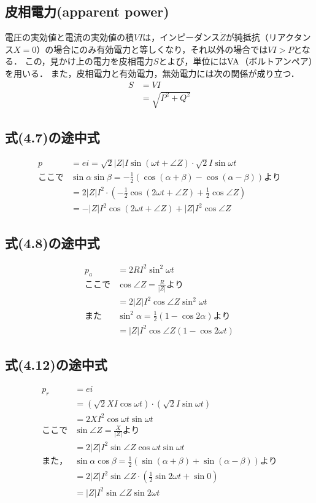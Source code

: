 \subsection{皮相電力(apparent power)\cite{11300007922816}}
電圧の実効値と電流の実効値の積$VI$は，インピーダンス$\dot{Z}$が純抵抗（リアクタンス$X=0$）の場合にのみ有効電力と等しくなり，それ以外の場合では$VI> P$となる．
この，見かけ上の電力を皮相電力$S$とよび，単位には$\rm{VA}$（ボルトアンペア）を用いる．
また，皮相電力と有効電力，無効電力には次の関係が成り立つ．
\begin{align}
	S &= VI\nonumber\\
	&= \sqrt{P^2+Q^2}
\end{align}

\subsection{式(4.7)の途中式}
\begin{align*}
	p&=ei=\sqrt{2}|Z|I\sin (\omega t+ \angle Z)  \cdot \sqrt{2}I\sin \omega t\\
	ここで&\sin \alpha \sin \beta=-\frac{1}{2}\left(\cos (\alpha +\beta)-\cos (\alpha -\beta)\right)より\\
	&=2|Z|I^{2}\cdot \left(-\frac{1}{2}\cos (2\omega t +\angle Z)+\frac{1}{2}\cos \angle Z\right)\\
	&=-|Z|I^{2}\cos (2\omega t+\angle Z)+|Z|I^{2}\cos \angle Z
\end{align*}

\subsection{式(4.8)の途中式}
\begin{align*}
	p_{a}&=2RI^{2}\sin ^{2} \omega t\\
	ここで&\cos \angle Z=\frac{R}{|Z|}より\\
	&=2|Z|I^{2}\cos \angle Z\sin ^{2} \omega t\\
	また&\sin ^{2} \alpha =\frac{1}{2}\left(1-\cos 2 \alpha\right)より\\
	&=|Z|I^{2}\cos \angle Z(1-\cos 2\omega t)
\end{align*}

\subsection{式(4.12)の途中式}
\begin{align*}
	p_{r}&=ei\\
	&=(\sqrt{2}XI\cos \omega t) \cdot (\sqrt{2}I\sin \omega t)\\
	&=2XI^{2}\cos \omega t \sin \omega t\\
	ここで&\sin \angle Z=\frac{X}{|Z|}より\\
	&=2|Z|I^{2}\sin \angle Z\cos \omega t \sin \omega t\\
	また，&\sin \alpha \cos \beta=\frac{1}{2}\left(\sin (\alpha +\beta)+\sin (\alpha -\beta)\right)より\\
	&=2|Z|I^{2}\sin \angle Z \cdot \left(\frac{1}{2}\sin 2 \omega t+\sin 0\right)\\
	&=|Z|I^{2}\sin \angle Z \sin 2\omega t
\end{align*}

